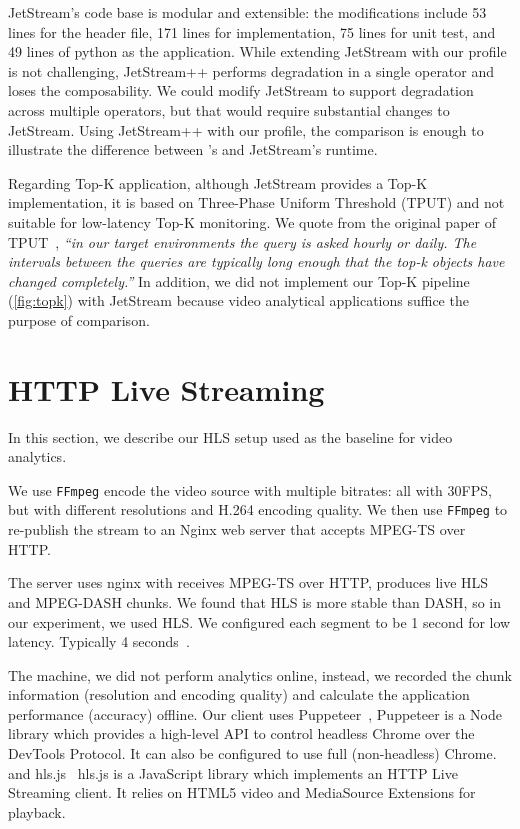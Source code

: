 \documentclass[twocolumn, 9pt]{article}
\begin{document}

JetStream's code base is modular and extensible: the modifications include 53
lines for the header file, 171 lines for implementation, 75 lines for unit test,
and 49 lines of python as the application. While extending JetStream with our
profile is not challenging, JetStream++ performs degradation in a single
operator and loses the composability. We could modify JetStream to support
degradation across multiple operators, but that would require substantial
changes to JetStream. Using JetStream++ with our profile, the comparison is
enough to illustrate the difference between \sysname{}'s and JetStream's
runtime.

Regarding Top-K application, although JetStream provides a Top-K implementation,
it is based on Three-Phase Uniform Threshold (TPUT) and not suitable for
low-latency Top-K monitoring. We quote from the original paper of
TPUT~\cite{cao2004efficient}, \textit{``in our target environments the query is
  asked hourly or daily. The intervals between the queries are typically long
  enough that the top-k objects have changed completely.''} In addition, we did
not implement our Top-K pipeline (\autoref{fig:topk}) with JetStream because
video analytical applications suffice the purpose of comparison.

\section{HTTP Live Streaming}
\label{appendix:hls}

In this section, we describe our HLS setup used as the baseline for video
analytics.

 We use \texttt{FFmpeg} encode the video source with
multiple bitrates: all with 30FPS, but with different resolutions and H.264
encoding quality. We then use \texttt{FFmpeg} to re-publish the stream to an
Nginx web server that accepts MPEG-TS over HTTP.

 The server uses nginx with \cite{nginx-ts-module} receives
MPEG-TS over HTTP, produces live HLS and MPEG-DASH chunks. We found that HLS is
more stable than DASH, so in our experiment, we used HLS. We configured each
segment to be 1 second for low latency. Typically 4 seconds~\cite{mao2017neural,
  sun2016cs2p, wang2016anatomy}.

 The machine, we did not perform analytics online, instead, we
recorded the chunk information (resolution and encoding quality) and calculate
the application performance (accuracy) offline. Our client uses
Puppeteer~\cite{puppeteer}, Puppeteer is a Node library which provides a
high-level API to control headless Chrome over the DevTools Protocol. It can
also be configured to use full (non-headless) Chrome. and hls.js~\cite{hls.js}
hls.js is a JavaScript library which implements an HTTP Live Streaming
client. It relies on HTML5 video and MediaSource Extensions for playback.

{\footnotesize 
  }
\end{document}
